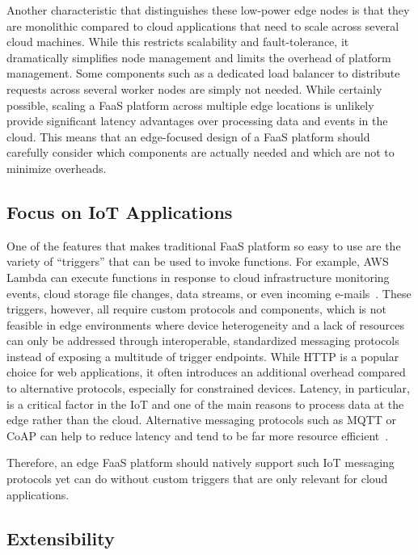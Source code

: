 Another characteristic that distinguishes these low-power edge nodes is that they are monolithic compared to cloud applications that need to scale across several cloud machines.
While this restricts scalability and fault-tolerance, it dramatically simplifies node management and limits the overhead of platform management.
Some components such as a dedicated load balancer to distribute requests across several worker nodes are simply not needed.
While certainly possible, scaling a FaaS platform across multiple edge locations is unlikely provide significant latency advantages over processing data and events in the cloud.
This means that an edge-focused design of a FaaS platform should carefully consider which components are actually needed and which are not to minimize overheads.

\subsection{Focus on IoT Applications}
\label{sec:focus_on_iot}

One of the features that makes traditional FaaS platform so easy to use are the variety of ``triggers'' that can be used to invoke functions.
For example, AWS Lambda can execute functions in response to cloud infrastructure monitoring events, cloud storage file changes, data streams, or even incoming e-mails~\cite{Baldini2017-zf}.
These triggers, however, all require custom protocols and components, which is not feasible in edge environments where device heterogeneity and a lack of resources can only be addressed through interoperable, standardized messaging protocols instead of exposing a multitude of trigger endpoints.
While HTTP is a popular choice for web applications, it often introduces an additional overhead compared to alternative protocols, especially for constrained devices.
Latency, in particular, is a critical factor in the IoT and one of the main reasons to process data at the edge rather than the cloud.
Alternative messaging protocols such as MQTT or CoAP can help to reduce latency and tend to be far more resource efficient~\cite{Laaroussi2018-fk,Naik2017-cn}.

Therefore, an edge FaaS platform should natively support such IoT messaging protocols yet can do without custom triggers that are only relevant for cloud applications.

\subsection{Extensibility}
\label{sec:extensibility}

